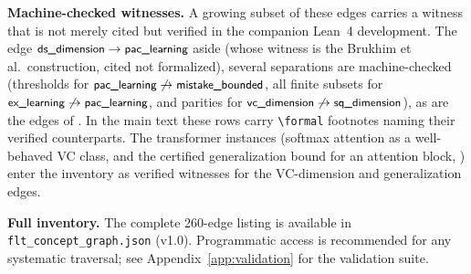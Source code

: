 \bigskip
\noindent\textbf{Machine-checked witnesses.}\quad
A growing subset of these edges carries a witness that is not merely cited but
verified in the companion Lean~4 development.  The  edge
$\nde{ds\_dimension}\to\nde{pac\_learning}$ aside (whose witness is the
Brukhim et al.\ construction, cited not formalized), several
 separations are machine-checked (thresholds for
$\nde{pac\_learning}\not\to\nde{mistake\_bounded}$, all finite subsets for
$\nde{ex\_learning}\not\to\nde{pac\_learning}$, and parities for
$\nde{vc\_dimension}\not\to\nde{sq\_dimension}$), as are the
 edges of .  In the main
text these rows carry \texttt{\textbackslash formal} footnotes naming their
verified counterparts.  The transformer instances (softmax attention as a
well-behaved VC class, and the certified generalization bound for an attention
block, ) enter the inventory as verified witnesses
for the VC-dimension and generalization edges.

\medskip
\noindent\textbf{Full inventory.}\quad
The complete 260-edge listing is available in \texttt{flt\_concept\_graph.json} (v1.0).
Programmatic access is recommended for any systematic traversal; see Appendix~\ref{app:validation} for the validation suite.
